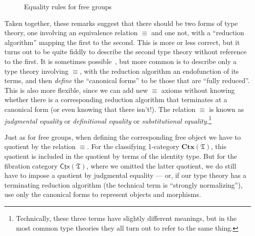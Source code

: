 \documentclass[12pt]{article}
\let\jdeq\equiv
\def\elt{\;\mathsf{elt}}
\def\equiv{\mathsf{Equiv}}
\def\fT{\mathfrak{T}}
\def\CtxT{\mathbf{Ctx}(\fT)}
\def\sCtx{\underline{\mathsf{Ctx}}}
\def\sCtxT{\sCtx(\fT)}
\numberwithin{equation}{section}
\begin{document}
\begin{subappendices}
\begin{figure}
  \centering
{}
\caption{Equality rules for free groups}
\label{fig:fg-taut-jdeq}
\end{figure}

Taken together, these remarks suggest that there should be two forms of type theory, one involving an equivalence relation $\jdeq$ and one not, with a ``reduction algorithm'' mapping the first to the second. %
This is more or less correct, but it turns out to be quite fiddly to describe the second type theory without reference to the first.
It is sometimes possible~\cite{hl:lf}, but more common is to describe only a type theory involving $\jdeq$, with the reduction algorithm an endofunction of its terms, and then \emph{define} the ``canonical forms'' to be those that are ``fully reduced''.
This is also more flexible, since we can add new $\jdeq$ axioms without knowing whether there is a corresponding reduction algorithm that terminates at a canonical form (or even knowing that there isn't!).
The relation $\jdeq$ is known as \emph{judgmental equality} or \emph{definitional equality} or \emph{substitutional equality}.\footnote{Technically, these three terms have slightly different meanings, but in the most common type theories they all turn out to refer to the same thing.}

Just as for free groups, when defining the corresponding free object we have to quotient by the relation $\jdeq$.
For the classifying 1-category $\CtxT$, this quotient is included in the quotient by terms of the identity type.
But for the fibration category $\sCtxT$, where we omitted the latter quotient, we do still have to impose a quotient by judgmental equality --- or, if our type theory has a terminating reduction algorithm (the technical term is ``strongly normalizing''), use only the canonical forms to represent objects and morphisms.


\end{subappendices}
\end{document}
